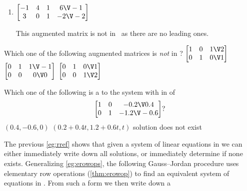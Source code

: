 \begin{example}
\begin{enumerate}[ref=\ref{eg:rref}(\alph*)]
\item \(\begin{bmatrix} -1&4&1&6\V-1
\\3&0&1&-2\V-2
 \end{bmatrix}\)
\begin{solution} 
This augmented matrix is not in \rref\ as there are no leading ones. 
\end{solution}
\end{enumerate}
\end{example}


\begin{activity}
Which one of the following augmented matrices is \emph{not} in ?
{\(\begin{bmatrix} 1&0&1\V2
\\0&1&0\V1 \end{bmatrix}\)}
{\(\begin{bmatrix} 0&1&1\V-1
\\0&0&0\V0 \end{bmatrix}\)}
{\(\begin{bmatrix} 0&1&0\V1
\\0&0&1\V2 \end{bmatrix}\)}
\end{activity}





\begin{activity}
Which one of the following is a  to the system with  in  of
\begin{equation*}
\begin{bmatrix} 1&0&-0.2\V0.4
\\0&1&-1.2\V-0.6 \end{bmatrix}?
\end{equation*}
{\((0.4,-0.6,0)\)}
{\((0.2+0.4t,1.2+0.6t,t)\)}
{solution does not exist}
\end{activity}



The previous \cref{eg:rref} shows that given a system of linear equations in  we can either immediately write down all solutions, or immediately determine if none exists.
Generalizing \cref{eg:erowops}, the following Gauss--Jordan procedure uses elementary row operations (\cref{thm:erowop}) to find an equivalent system of equations in . 
From such a form we then write down a 




